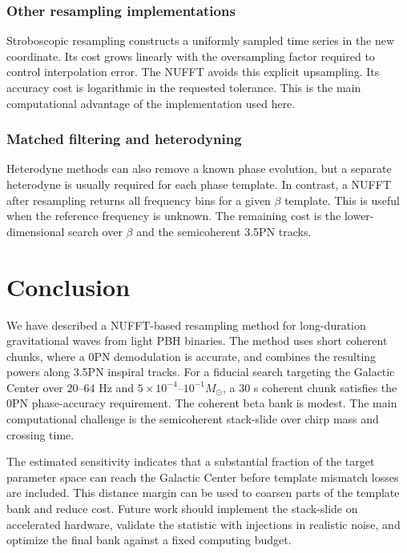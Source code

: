 \documentclass[aps,prd,amsmath,floats,floatfix, twocolumn,
superscriptaddress,nofootinbib,showpacs]{revtex4-2}
\begin{document}
\subsubsection{Other resampling implementations}
Stroboscopic resampling constructs a uniformly sampled time series in the new
coordinate.  Its cost grows linearly with the oversampling factor required to
control interpolation error.  The NUFFT avoids this explicit upsampling.  Its
accuracy cost is logarithmic in the requested tolerance.  This is the main
computational advantage of the implementation used here.

\subsubsection{Matched filtering and heterodyning}
Heterodyne methods can also remove a known phase evolution, but a separate
heterodyne is usually required for each phase template.  In contrast, a NUFFT
after resampling returns all frequency bins for a given $\beta$ template.  This
is useful when the reference frequency is unknown.  The remaining cost is the
lower-dimensional search over $\beta$ and the semicoherent 3.5PN tracks.




\section{Conclusion}
\label{sec:conclusion}
We have described a NUFFT-based resampling method for long-duration
gravitational waves from light PBH binaries.  The method uses short coherent
chunks, where a 0PN demodulation is accurate, and combines the resulting powers
along 3.5PN inspiral tracks.  For a fiducial search targeting the Galactic
Center over $20$--$64$ Hz and $5\times10^{-4}$--$10^{-1}M_\odot$, a
$30$ s coherent chunk satisfies the 0PN phase-accuracy requirement.  The
coherent beta bank is modest.  The main computational challenge is the
semicoherent stack-slide over chirp mass and crossing time.

The estimated sensitivity indicates that a substantial fraction of the target
parameter space can reach the Galactic Center before template mismatch losses
are included.  This distance margin can be used to coarsen parts of the
template bank and reduce cost.  Future work should implement the stack-slide on
accelerated hardware, validate the statistic with injections in realistic
noise, and optimize the final bank against a fixed computing budget.
\end{document}
